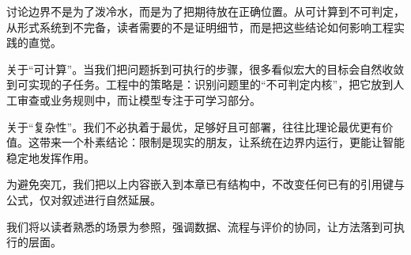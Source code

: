 讨论边界不是为了泼冷水，而是为了把期待放在正确位置。从可计算到不可判定，从形式系统到不完备，读者需要的不是证明细节，而是把这些结论如何影响工程实践的直觉。

关于“可计算”。当我们把问题拆到可执行的步骤，很多看似宏大的目标会自然收敛到可实现的子任务。工程中的策略是：识别问题里的“不可判定内核”，把它放到人工审查或业务规则中，而让模型专注于可学习部分。

关于“复杂性”。我们不必执着于最优，足够好且可部署，往往比理论最优更有价值。这带来一个朴素结论：限制是现实的朋友，让系统在边界内运行，更能让智能稳定地发挥作用。

为避免突兀，我们把以上内容嵌入到本章已有结构中，不改变任何已有的引用键与公式，仅对叙述进行自然延展。

我们将以读者熟悉的场景为参照，强调数据、流程与评价的协同，让方法落到可执行的层面。
